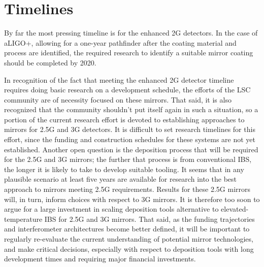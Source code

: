 \section{Timelines}

By far the most pressing timeline is for the enhanced 2G detectors. In the case of aLIGO+, allowing for a one-year pathfinder after the coating material and process are identified, the required research to identify a suitable mirror coating should be completed by  2020. 

In recognition of the fact that meeting the enhanced 2G detector timeline requires doing basic research on a development schedule, the efforts of the LSC community are of necessity focused on these mirrors. That said, it is also recognized that the community shouldn't put itself again in such a situation, so a portion of the current research effort is devoted to establishing approaches to mirrors for 2.5G and 3G detectors. It is difficult to set research timelines for this effort, since the funding and construction schedules for these systems are not yet established. Another open question is the deposition process that will be required for the 2.5G and 3G mirrors; the further that process is from conventional IBS, the longer it is likely to take to develop suitable tooling. It seems that in any plausible scenario at least five years are available for research into the best approach to mirrors meeting 2.5G requirements. Results for these 2.5G mirrors will, in turn, inform choices with respect to 3G mirrors. It is therefore too soon to argue for a large investment in scaling deposition tools alternative to elevated-temperature IBS for 2.5G and 3G mirrors. That said, as the funding trajectories and interferometer architectures become better defined, it will be important to regularly re-evaluate the current understanding of potential mirror technologies, and make critical decisions, especially with respect to deposition tools with long development times and requiring major financial investments.

